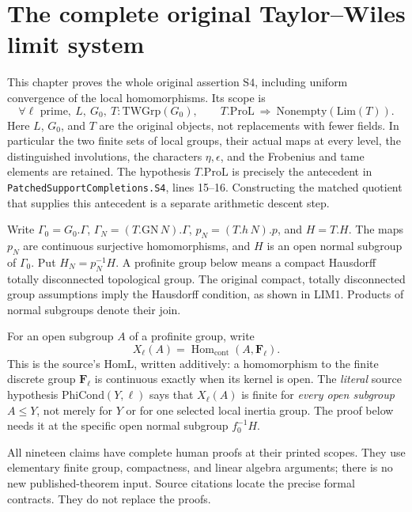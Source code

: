 \section{The complete original Taylor--Wiles limit system}
\label{sec:limit-system-v039}

This chapter proves the whole original assertion \(\mathrm{S4}\), including
uniform convergence of the local homomorphisms.  Its scope is
\[
 \forall\ell\text{ prime},\ L,\ G_0,\ T:\mathrm{TWGrp}(G_0),\qquad
 T.\mathrm{ProL}\ \Longrightarrow\ \mathrm{Nonempty}(\mathrm{Lim}(T)).
 \tag{LIM.1}
\]
Here \(L\), \(G_0\), and \(T\) are the original objects, not replacements
with fewer fields.  In particular the two finite sets of local groups,
their actual maps at every level, the distinguished involutions,
the characters \(\eta,\epsilon\), and the Frobenius and tame elements
are retained.  The hypothesis \(T.\mathrm{ProL}\) is precisely the
antecedent in \texttt{PatchedSupportCompletions.S4}, lines 15--16.
Constructing the matched quotient that supplies this antecedent is a
separate arithmetic descent step.

Write \(\Gamma_0=G_0.\Gamma\),
\(\Gamma_N=(T.\mathrm{GN}\,N).\Gamma\),
\(p_N=(T.h\,N).p\), and \(H=T.H\).
The maps \(p_N\) are continuous surjective homomorphisms, and
\(H\) is an open normal subgroup of \(\Gamma_0\).
Put \(H_N=p_N^{-1}H\).  A profinite group below means a compact Hausdorff
totally disconnected topological group.  The original compact,
totally disconnected group assumptions imply the Hausdorff condition,
as shown in LIM1.  Products of normal subgroups denote their join.

For an open subgroup \(A\) of a profinite group, write
\[
 X_\ell(A)=\operatorname{Hom}_{\mathrm{cont}}(A,\mathbf F_\ell).
\]
This is the source's \(\mathrm{HomL}\), written additively: a homomorphism
to the finite discrete group \(\mathbf F_\ell\) is continuous exactly
when its kernel is open.  The \emph{literal} source hypothesis
\(\mathrm{PhiCond}(Y,\ell)\) says that \(X_\ell(A)\) is finite for
\emph{every open subgroup} \(A\le Y\), not merely for \(Y\) or for
one selected local inertia group.  The proof below needs it at the
specific open normal subgroup \(f_0^{-1}H\).

All nineteen claims have complete human proofs at their printed scopes.
They use elementary finite group, compactness, and linear algebra
arguments; there is no new published-theorem input.  Source citations
locate the precise formal contracts.  They do not replace the proofs.

